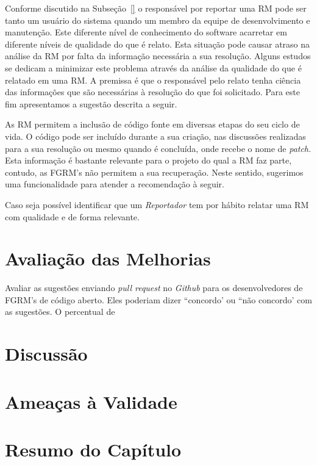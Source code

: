 Conforme discutido na Subseção~\ref{} o responsável por reportar uma RM pode ser
tanto um usuário do sistema quando um membro da equipe de desenvolvimento e
manutenção. Este diferente nível de conhecimento do software acarretar em
diferente níveis de qualidade do que é relato. Esta situação pode causar atraso
na análise da RM por falta da informação necessária a sua resolução. Alguns
estudos se dedicam a minimizar este problema através da análise da qualidade do
que é relatado em uma RM. A premissa é que o responsável pelo relato tenha
ciência das informações que são necessárias à resolução do que foi solicitado.
Para este fim apresentamos a sugestão descrita a seguir.


As RM permitem a inclusão de código fonte em diversas etapas do seu ciclo de
vida. O código pode ser incluído durante a sua criação, nas discussões
realizadas para a sua resolução ou mesmo quando é concluída, onde recebe o nome
de \textit{patch.} Esta informação é bastante relevante para o projeto do qual a
RM faz parte, contudo, as FGRM's não permitem a sua recuperação. Neste sentido,
sugerimos uma funcionalidade para atender a recomendação à seguir.


Caso seja possível identificar que um \textit{Reportador} tem por hábito relatar
uma RM com qualidade e de forma relevante.



\section{Avaliação das Melhorias}
\label{sec:sug_melhoria_avaliacao_das_melhorias}

Avaliar as sugestões enviando \textit{pull request} no \textit{Github} para os
desenvolvedores de FGRM's de código aberto. Eles poderiam dizer ``concordo' ou
``não concordo' com as sugestões. O percentual de

\section{Discussão}
\label{sec:sug_melhoria_discussao}

\section{Ameaças à Validade}
\label{sec:sug_melhoria_ameacas}

\section{Resumo do Capítulo}
\label{sec:sug_melhoria_resumo}
